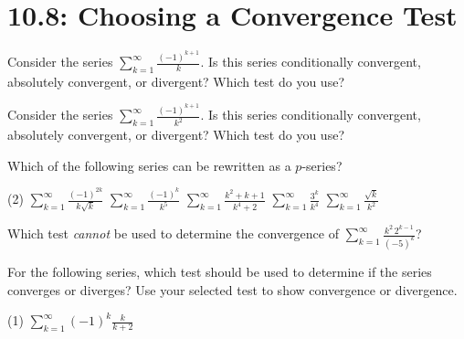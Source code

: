 \documentclass[../mathNotesPreamble]{subfiles}
\begin{document}
  \section*{10.8: Choosing a Convergence Test}

  \begin{ex*}
    Consider the series $\displaystyle\sum_{k=1}^\infty \frac{(-1)^{k+1}}{k}$. Is this series conditionally convergent, absolutely convergent, or divergent? Which test do you use?
  \end{ex*}
  \pagebreak

  \begin{ex*}
    Consider the series $\displaystyle\sum_{k=1}^\infty \frac{(-1)^{k+1}}{k^2}$. Is this series conditionally convergent, absolutely convergent, or divergent? Which test do you use?
  \end{ex*}
  \pagebreak

  \begin{ex*}
    Which of the following series can be rewritten as a $p$-series?
  \end{ex*}
  \begin{tasks}[after-item-skip=\stretch{1}, label=,item-indent=0pt](2)
    \task $\displaystyle\sum_{k=1}^\infty \frac{(-1)^{2k}}{k\sqrt{k}}$
    \task $\displaystyle\sum_{k=1}^\infty \frac{(-1)^k}{k^5}$
    \task $\displaystyle\sum_{k=1}^\infty \frac{k^2+k+1}{k^4+2}$
    \task $\displaystyle\sum_{k=1}^\infty \frac{3^k}{k^4}$
    \task $\displaystyle\sum_{k=1}^\infty \frac{\sqrt{k}}{k^2}$
  \end{tasks}
  \pagebreak

  \begin{ex*}
    Which test \textit{cannot} be used to determine the convergence of $\displaystyle\sum_{k=1}^\infty \frac{k^2\,2^{k-1}}{(-5)^k}$?
  \end{ex*}

  \begin{ex*}
    For the following series, which test should be used to determine if the series converges or diverges? Use your selected test to show convergence or divergence.
  \end{ex*}
  \begin{tasks}[after-item-skip=\stretch{1}, label=,item-indent=0pt](1)
    \task $\displaystyle\sum_{k=1}^\infty (-1)^k \frac{k}{k+2}$
  \end{tasks}
  \pagebreak
\end{document}
